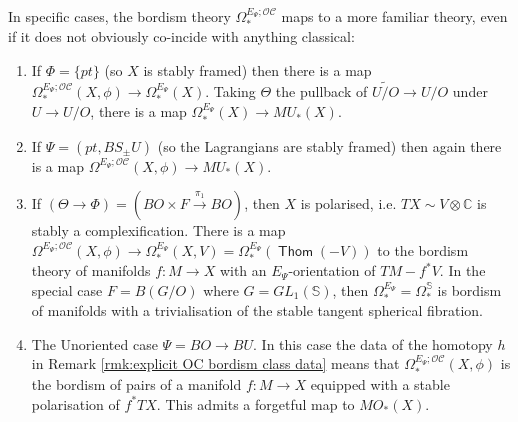 \documentclass{TPmod}
\def\bC{\mathbb{C}}
\def\bS{\mathbb{S}}
\DeclareMathOperator{\Thom}{\mathsf{Thom}}
\newcommand{\cC}{\mathcal{C}}
\newcommand{\cO}{\mathcal{O}}
\numberwithin{equation}{section}
\begin{document}
\begin{ex}\label{ex:OC bordism maps here}
    In specific cases, the bordism theory $\Omega_*^{E_{\Psi};\cO\cC}$ maps to a more familiar theory, even if it does not obviously co-incide with anything classical:
    \begin{enumerate}
    \item If $\Phi = \{pt\}$ (so $X$ is stably framed) then there is a map $\Omega_*^{E_{\Psi};\cO\cC}(X,\phi) \to \Omega_*^{E_{\Psi}}(X)$. Taking $\Theta$ the pullback of $\widetilde{U/O} \to U/O$ under $U \to U/O$, there is a map $\Omega^{E_{\Psi}}_*(X) \to MU_*(X)$.
     \item If $\Psi = (pt,BS_{\pm}U)$ (so the Lagrangians are stably framed) then again there is a map $\Omega^{E_{\Psi};\cO\cC}(X,\phi) \to MU_*(X)$.
        \item If $(\Theta \to \Phi) = (BO \times F \stackrel{\pi_1}{\longrightarrow} BO)$, then $X$ is polarised, i.e. $TX \sim V\otimes \bC$ is stably a complexification. There is a map  $\Omega^{E_{\Psi};\cO\cC}(X,\phi) \to \Omega^{E_{\Psi}}_*(X,V) = \Omega^{E_{\Psi}}_*(\Thom(-V))$ to the bordism theory of manifolds $f: M \to X$ with an $E_{\Psi}$-orientation of $TM-f^*V$. In the special case $F = B(G/O)$ where $G = GL_1(\bS)$, then $\Omega^{E_{\Psi}}_* = \Omega^{\bS}_*$ is bordism of manifolds with a trivialisation of the stable tangent spherical fibration.
       
        \item The Unoriented case $\Psi = BO \to BU$. In this case the data of the homotopy $h$ in Remark \ref{rmk:explicit OC bordism class data} means that $\Omega^{E_{\Psi};\cO\cC}_*(X,\phi)$ is the bordism of pairs of a manifold $f: M \to X$ equipped with a stable polarisation of $f^*TX$. This admits a forgetful map to $MO_*(X)$.
    \end{enumerate}
\end{ex}

    
\end{document}
